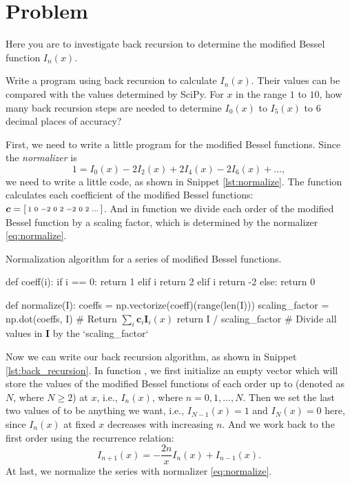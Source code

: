 \section{Problem \thesection}

Here you are to investigate back recursion to determine the modified Bessel function
\(I_n(x)\).

\Question Write a program using back recursion to calculate \(I_n(x)\).
Their values can be compared with the values determined by SciPy.
For \(x\) in the range \(1\) to \(10\), how many back recursion steps are needed to
determine \(I_0(x)\) to \(I_5(x)\) to \(6\) decimal places of accuracy?

\Answer First, we need to write a little program for the modified Bessel functions.
Since the \emph{normalizer} is
%
\begin{equation}\label{eq:normalize}
    1 = I_0(x) - 2 I_2(x) + 2 I_4(x) - 2 I_6(x) + \ldots,
\end{equation}
%
we need to write a little code, as shown in Snippet \ref{lst:normalize}.
The  function calculates each coefficient of the
modified Bessel functions: \(\bm{c} = \begin{bsmallmatrix}1 & 0 & -2 & 0 & 2 & -2 & 0 & 2 & \ldots\end{bsmallmatrix}\).
And in function  we divide each order of the modified Bessel function
by a scaling factor, which is determined by the normalizer \eqref{eq:normalize}.

\begin{algorithm}
    \caption{Normalization algorithm for a series of modified Bessel functions.}
    \label{lst:normalize}
    \begin{pythoncode}
        def coeff(i):
            if i == 0:
                return 1
            elif i %
                return 2
            elif i %
                return -2
            else:
                return 0


        def normalize(I):
            coeffs = np.vectorize(coeff)(range(len(I)))
            scaling_factor = np.dot(coeffs, I)  # Return $\sum_i \bm{c}_i \bm{I}_i(x)$
            return I / scaling_factor  # Divide all values in $\bm{I}$ by the `scaling_factor`
    \end{pythoncode}
\end{algorithm}

Now we can write our back recursion algorithm, as shown in Snippet \ref{lst:back_recursion}.
In function , we first initialize an empty vector  which
will store the values of the modified Bessel functions of each order up to
 (denoted as \(N\), where \(N \geq 2\)) at \(x\), i.e., \(I_n(x)\), where
\(n = 0, 1, \ldots, N\).
Then we set the last two values of  to be anything we want, i.e.,
\(I_{N-1}(x) = 1\) and \(I_N(x) = 0\) here,
since \(I_n(x)\) at fixed \(x\) decreases with increasing \(n\).
And we work back to the first order using the recurrence relation:
%
\begin{equation}
    I_{n + 1}(x) = -\frac{ 2 n }{ x } I_n(x) + I_{n - 1}(x).
\end{equation}
%
At last, we normalize the series with normalizer \eqref{eq:normalize}.

